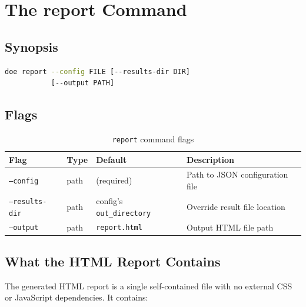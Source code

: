 \documentclass[11pt]{book}
\begin{document}
\chapter{The report Command}
\label{ch:report}

\section{Synopsis}

\begin{lstlisting}[language=bash]
doe report --config FILE [--results-dir DIR]
           [--output PATH]
\end{lstlisting}

\section{Flags}

\begin{table}[H]
\centering
\caption{\texttt{report} command flags}
\begin{tabular}{@{}lllp{4.5cm}@{}}
\toprule
\textbf{Flag} & \textbf{Type} & \textbf{Default} & \textbf{Description} \\
\midrule
\texttt{--config} & path & (required) & Path to JSON configuration file \\
\texttt{--results-dir} & path & config's \texttt{out\_directory} & Override result file location \\
\texttt{--output} & path & \texttt{report.html} & Output HTML file path \\
\bottomrule
\end{tabular}
\end{table}

\section{What the HTML Report Contains}

The generated HTML report is a single self-contained file with no external CSS or JavaScript dependencies. It contains:
\end{document}
